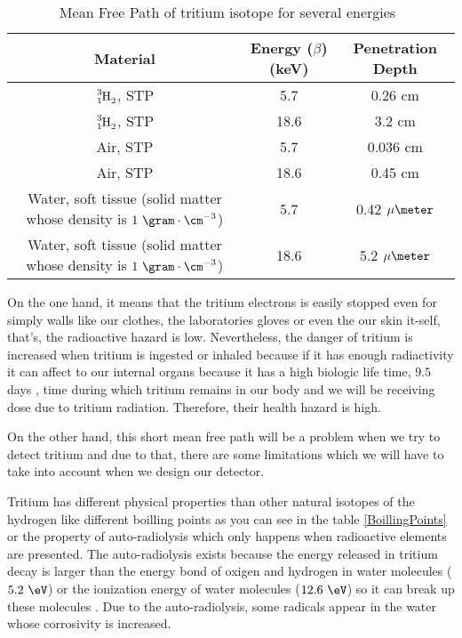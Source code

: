 \begin{table}[htbp]
\begin{center}
\begin{tabular}{|c|c|c|}
\hline
Material & Energy ($\beta$)(keV) & Penetration Depth \\
\hline \hline \hline
$\ce{\ce{^{3}_{1}H_2}}$, STP & 5.7 & 0.26 cm \\ \hline
$\ce{\ce{^{3}_{1}H_2}}$, STP & 18.6 & 3.2 cm \\ \hline
Air, STP & 5.7 & 0.036 cm \\ \hline
Air, STP & 18.6 & 0.45 cm \\ \hline
\parbox{10em}{\centering Water, soft tissue\\  (solid matter whose \\  density is $1~\gram\cdot\cm^{-3}$)} & 5.7 & 0.42 $\mu\meter$\\ \hline
\parbox{10em}{\centering Water, soft tissue\\  (solid matter whose \\  density is $1~\gram\cdot\cm^{-3}$)} & 18.6 & 5.2 $\mu\meter$ \\ \hline
\end{tabular}
\caption{Mean Free Path of tritium isotope for several energies~\cite{TritiumHandling}}
\label{MeanFreePathTritium}
\end{center}
\end{table}

On the one hand, it means that the tritium electrons is easily stopped even for simply walls like our clothes, the laboratories gloves or even the our skin it-self, that's, the radioactive hazard is low. Nevertheless, the danger of tritium is increased when tritium is ingested or inhaled because if it has enough radiactivity it can affect to our internal organs because it has a high biologic life time, $9.5$ days \cite{TritiumHandling}, time during which tritium remains in our body and we will be receiving dose due to tritium radiation. Therefore, their health hazard is high.

On the other hand, this short mean free path will be a problem when we try to detect tritium and due to that, there are some limitations which we will have to take into account when we design our detector. 

Tritium has different physical properties than other natural isotopes of the hydrogen like different boilling points as you can see in the table \ref{BoillingPoints} or the property of auto-radiolysis which only happens when radioactive elements are presented. The auto-radiolysis exists because the energy released in tritium decay is larger than the energy bond of oxigen and hydrogen in water molecules ($5.2~\eV$) or the ionization energy of water molecules ($12.6~\eV$) so it can break up these molecules \cite{AutoRadyolisis}. Due to the auto-radiolysis, some radicals appear in the water whose corrosivity is increased.

